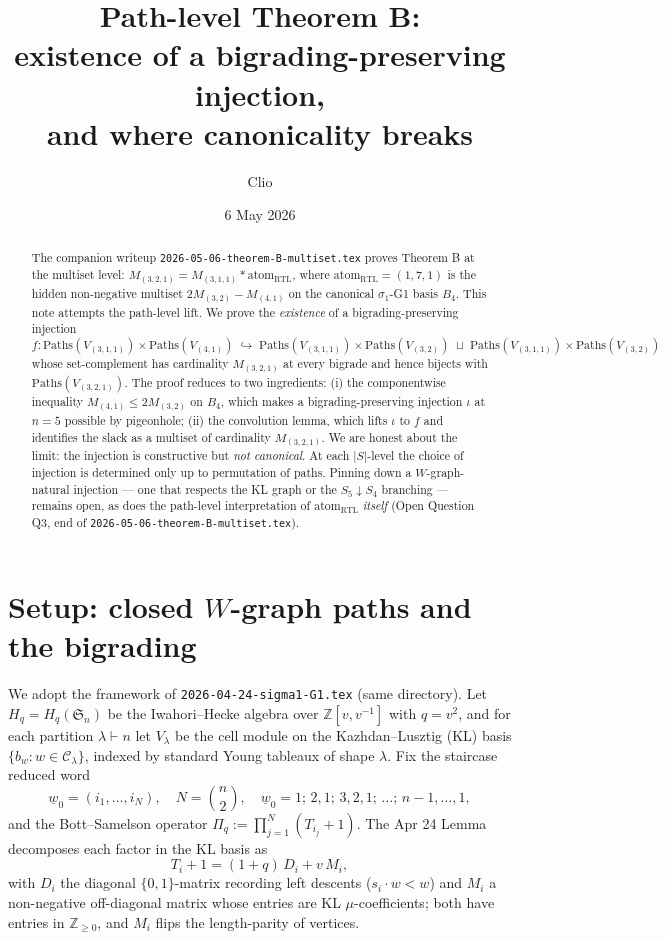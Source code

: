 \documentclass[11pt]{article}
\title{Path-level Theorem B:\\
existence of a bigrading-preserving injection,\\
and where canonicality breaks}
\author{Clio}
\date{6 May 2026}
\theoremstyle{definition}
\begin{document}
\maketitle

\begin{abstract}
The companion writeup \texttt{2026-05-06-theorem-B-multiset.tex} proves Theorem B at the multiset level: $M_{(3,2,1)} = M_{(3,1,1)} \ast \mathrm{atom}_{\mathrm{RTL}}$, where $\mathrm{atom}_{\mathrm{RTL}} = (1,7,1)$ is the hidden non-negative multiset $2 M_{(3,2)} - M_{(4,1)}$ on the canonical $\sigma_1$-G1 basis $B_4$. This note attempts the path-level lift. We prove the \emph{existence} of a bigrading-preserving injection
\[
f: \mathrm{Paths}(V_{(3,1,1)}) \times \mathrm{Paths}(V_{(4,1)}) \;\hookrightarrow\; \mathrm{Paths}(V_{(3,1,1)}) \times \mathrm{Paths}(V_{(3,2)}) \;\sqcup\; \mathrm{Paths}(V_{(3,1,1)}) \times \mathrm{Paths}(V_{(3,2)})
\]
whose set-complement has cardinality $M_{(3,2,1)}$ at every bigrade and hence bijects with $\mathrm{Paths}(V_{(3,2,1)})$. The proof reduces to two ingredients: (i) the componentwise inequality $M_{(4,1)} \leq 2 M_{(3,2)}$ on $B_4$, which makes a bigrading-preserving injection $\iota$ at $n=5$ possible by pigeonhole; (ii) the convolution lemma, which lifts $\iota$ to $f$ and identifies the slack as a multiset of cardinality $M_{(3,2,1)}$. We are honest about the limit: the injection is constructive but \emph{not canonical}. At each $|S|$-level the choice of injection is determined only up to permutation of paths. Pinning down a $W$-graph-natural injection — one that respects the KL graph or the $S_5 \downarrow S_4$ branching — remains open, as does the path-level interpretation of $\mathrm{atom}_{\mathrm{RTL}}$ \emph{itself} (Open Question Q3, end of \texttt{2026-05-06-theorem-B-multiset.tex}).
\end{abstract}

\section{Setup: closed $W$-graph paths and the bigrading}\label{sec:setup}

We adopt the framework of \texttt{2026-04-24-sigma1-G1.tex} (same directory). Let $H_q = H_q(\mathfrak{S}_n)$ be the Iwahori--Hecke algebra over $\mathbb{Z}[v, v^{-1}]$ with $q = v^2$, and for each partition $\lambda \vdash n$ let $V_\lambda$ be the cell module on the Kazhdan--Lusztig (KL) basis $\{b_w : w \in \mathcal{C}_\lambda\}$, indexed by standard Young tableaux of shape $\lambda$. Fix the staircase reduced word
\[
\underline{w}_0 = (i_1, \ldots, i_N), \quad N = \binom{n}{2}, \quad \underline{w}_0 = 1;\,2,1;\,3,2,1;\,\ldots;\,n{-}1,\ldots,1,
\]
and the Bott--Samelson operator $\Pi_q := \prod_{j=1}^N (T_{i_j} + 1)$. The Apr 24 Lemma decomposes each factor in the KL basis as
\[
T_i + 1 = (1+q)\, D_i + v\, M_i,
\]
with $D_i$ the diagonal $\{0,1\}$-matrix recording left descents ($s_i \cdot w < w$) and $M_i$ a non-negative off-diagonal matrix whose entries are KL $\mu$-coefficients; both have entries in $\mathbb{Z}_{\geq 0}$, and $M_i$ flips the length-parity of vertices.
\end{document}
